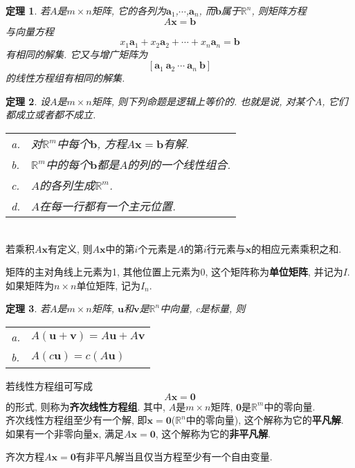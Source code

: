 \documentclass[UTF8,fontset=ubuntu]{ctexart}
\theoremstyle{nonumberplain}
\theoremstyle{break}
\newtheorem{theorem}{定理}
\theoremstyle{empty}
\begin{document}
\begin{theorem}
若$A$是$m\times n$矩阵, 它的各列为$\bm{a}_1$,$\cdots$,$\bm{a}_n$, 而$\bm{b}$属于$\mathbb{R}^n$, 则矩阵方程
\[A\bm{x}=\bm{b}\]
与向量方程
\[x_1\bm{a}_1+x_2\bm{a}_2+\cdots+x_n\bm{a}_n=\bm{b}\]
有相同的解集. 它又与增广矩阵为
\[[\bm{a}_1\ \bm{a}_2\ \cdots\ \bm{a}_n\ \bm{b}]\]
的线性方程组有相同的解集.\\[2ex]
\end{theorem}
\begin{theorem}
设$A$是$m\times n$矩阵, 则下列命题是逻辑上等价的. 也就是说, 对某个$A$, 它们都成立或者都不成立.\\
\begin{tabular}{l@{\,}l}
a. & 对$\mathbb{R}^m$中每个$\bm{b}$, 方程$A\bm{x}=\bm{b}$有解.\\
b. & $\mathbb{R}^m$中的每个$\bm{b}$都是$A$的列的一个线性组合.\\
c. & $A$的各列生成$\mathbb{R}^m$.\\
d. & $A$在每一行都有一个主元位置.\\[2ex]
\end{tabular}
\end{theorem}
\begin{law}[计算$A\bm{x}$的行--向量规则]\ \\
若乘积$A\bm{x}$有定义, 则$A\bm{x}$中的第$i$个元素是$A$的第$i$行元素与$\bm{x}$的相应元素乘积之和.
\end{law}
矩阵的主对角线上元素为1, 其他位置上元素为0, 这个矩阵称为\textbf{单位矩阵}, 并记为$I$.\\
如果矩阵为$n\times n$单位矩阵, 记为$I_n$.\\[2ex]
\begin{theorem}
若$A$是$m\times n$矩阵, $\bm{u}$和$\bm{v}$是$\mathbb{R}^n$中向量, c是标量, 则\\
\begin{tabular}{l@{\,}l}
a. & $A(\bm{u}+\bm{v})=A\bm{u}+A\bm{v}$\\
b. & $A(c\bm{u})=c(A\bm{u})$
\end{tabular}
\end{theorem}
若线性方程组可写成
\[A\bm{x}=\bm{0}\]
的形式, 则称为\textbf{齐次线性方程组}. 其中, $A$是$m\times n$矩阵, $\bm{0}$是$\mathbb{R}^m$中的零向量.\\
齐次线性方程组至少有一个解, 即$\bm{x}=\bm{0}$($\mathbb{R}^n$中的零向量), 这个解称为它的\textbf{平凡解}.\\
如果有一个非零向量$\bm{x}$, 满足$A\bm{x}=\bm{0}$, 这个解称为它的\textbf{非平凡解}.\\[2ex]
\begin{law}
齐次方程$A\bm{x}=\bm{0}$有非平凡解当且仅当方程至少有一个自由变量.
\end{law}
\end{document}
